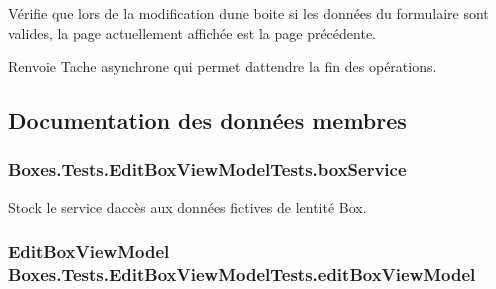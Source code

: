 Vérifie que lors de la modification d\textquotesingle{}une boite si les données du formulaire sont valides, la page actuellement affichée est la page précédente. 

\begin{DoxyReturn}{Renvoie}
Tache asynchrone qui permet d\textquotesingle{}attendre la fin des opérations. 
\end{DoxyReturn}


\subsection{Documentation des données membres}
\subsubsection[{\texorpdfstring{box\+Service}{boxService}}]{ Boxes.\+Tests.\+Edit\+Box\+View\+Model\+Tests.\+box\+Service\hspace{0.3cm}{\ttfamily [private]}}\hypertarget{class_boxes_1_1_tests_1_1_edit_box_view_model_tests_a7047dceb7858dea179eebe2e73c74e11}{}\label{class_boxes_1_1_tests_1_1_edit_box_view_model_tests_a7047dceb7858dea179eebe2e73c74e11}


Stock le service d\textquotesingle{}accès aux données fictives de l\textquotesingle{}entité Box. 

\subsubsection[{\texorpdfstring{edit\+Box\+View\+Model}{editBoxViewModel}}]{\setlength{\rightskip}{0pt plus 5cm}Edit\+Box\+View\+Model Boxes.\+Tests.\+Edit\+Box\+View\+Model\+Tests.\+edit\+Box\+View\+Model\hspace{0.3cm}{\ttfamily [private]}}\hypertarget{class_boxes_1_1_tests_1_1_edit_box_view_model_tests_ae401163363971887290a6f0fee30e5e9}{}\label{class_boxes_1_1_tests_1_1_edit_box_view_model_tests_ae401163363971887290a6f0fee30e5e9}


